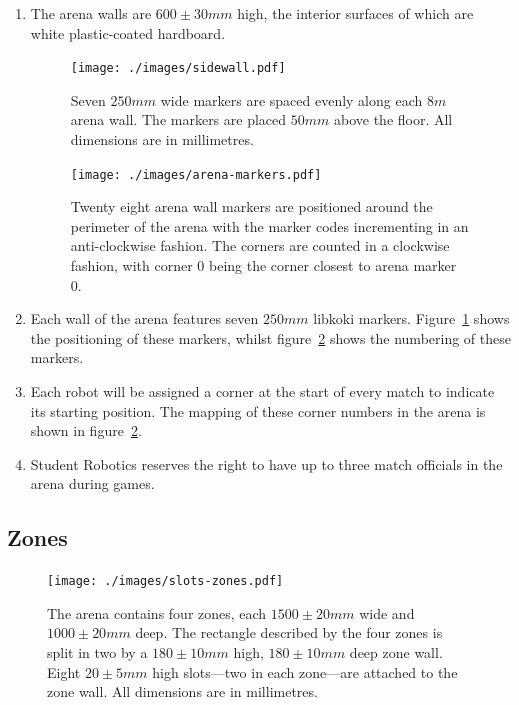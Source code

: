 \begin{enumerate}
\item The arena walls are $600\pm30mm$ high, the interior surfaces of which are white plastic-coated hardboard.

\begin{figure}
  \centering
  \texttt{[image: ./images/sidewall.pdf]}
  \caption{Seven $250mm$ wide markers are spaced evenly along each $8m$ arena wall.
           The markers are placed $50mm$ above the floor.
	   All dimensions are in millimetres.}
  \label{fig:arena-wall}
\end{figure}

\begin{figure}
  \centering
  \texttt{[image: ./images/arena-markers.pdf]}
  \caption{Twenty eight arena wall markers are positioned around the perimeter of the arena with the marker codes incrementing in an anti-clockwise fashion.
           The corners are counted in a clockwise fashion, with corner 0 being the corner closest to arena marker 0.}
  \label{fig:arena-zones}
\end{figure}

\item Each wall of the arena features seven $250mm$ libkoki markers.
      Figure~\ref{fig:arena-wall} shows the positioning of these markers, whilst figure~\ref{fig:arena-zones} shows the numbering of these markers.

\item Each robot will be assigned a corner at the start of every match to indicate its starting position.
      The mapping of these corner numbers in the arena is shown in figure~\ref{fig:arena-zones}.

\item Student Robotics reserves the right to have up to three match officials in the arena during games.

\end{enumerate}


\subsection{Zones}
\label{sub:Zones}

\begin{figure}
  \centering
  \texttt{[image: ./images/slots-zones.pdf]}
  \caption{The arena contains four zones, each $1500 \pm 20mm$ wide and $1000 \pm 20mm$ deep.
           The rectangle described by the four zones is split in two by a $180 \pm 10mm$ high, $180 \pm 10mm$ deep zone wall.
           Eight $20 \pm 5mm$ high slots---two in each zone---are attached to the zone wall.
           All dimensions are in millimetres.}
  \label{fig:slots-zones}
\end{figure}

